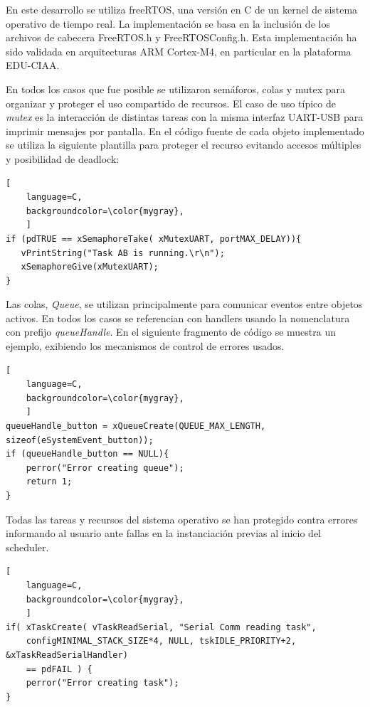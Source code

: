 En este desarrollo se utiliza freeRTOS, una versión en C de un kernel de sistema operativo de tiempo real. La implementación se basa en la inclusión de los archivos de cabecera FreeRTOS.h y FreeRTOSConfig.h. Esta implementación ha sido validada en arquitecturas ARM Cortex-M4, en particular en la plataforma EDU-CIAA. 

En todos los casos que fue posible se utilizaron semáforos, colas y mutex para organizar y proteger el uso compartido de recursos. El caso de uso típico de \textit{mutex} es la interacción de distintas tareas con la misma interfaz UART-USB para imprimir mensajes por pantalla. En el código fuente de cada objeto implementado se utiliza la siguiente plantilla para proteger el recurso evitando accesos múltiples y posibilidad de deadlock:\\

\begin{lstlisting}[
	language=C, 
	backgroundcolor=\color{mygray},
	]
if (pdTRUE == xSemaphoreTake( xMutexUART, portMAX_DELAY)){
   vPrintString("Task AB is running.\r\n");
   xSemaphoreGive(xMutexUART);
}
\end{lstlisting}

Las colas, \textit{Queue}, se utilizan principalmente para comunicar eventos entre objetos activos. En todos los casos se referencian con handlers usando la nomenclatura con prefijo \textit{queueHandle}. En el siguiente fragmento de código se muestra un ejemplo, exibiendo los mecanismos de control de errores usados. \\

\begin{lstlisting}[
	language=C, 
	backgroundcolor=\color{mygray},
	]
queueHandle_button = xQueueCreate(QUEUE_MAX_LENGTH, sizeof(eSystemEvent_button));
if (queueHandle_button == NULL){
    perror("Error creating queue");
    return 1;
}
\end{lstlisting}


Todas las tareas y recursos del sistema operativo se han protegido contra errores informando al usuario ante fallas en la instanciación previas al inicio del scheduler.

\begin{lstlisting}[
	language=C, 
	backgroundcolor=\color{mygray},
	]
if( xTaskCreate( vTaskReadSerial, "Serial Comm reading task", 
    configMINIMAL_STACK_SIZE*4, NULL, tskIDLE_PRIORITY+2, &xTaskReadSerialHandler) 
    == pdFAIL ) {
    perror("Error creating task");
}
\end{lstlisting}

